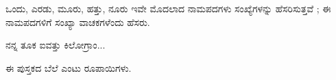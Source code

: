 
\indent ಒಂದು, ಎರಡು, ಮೂರು, ಹತ್ತು, ನೂರು ಇವೇ ಮೊದಲಾದ ನಾಮಪದಗಳು ಸಂಖ್ಯೆಗಳನ್ನು ಹೆಸರಿಸುತ್ತವೆ ; ಈ ನಾಮಪದಗಳಿಗೆ ಸಂಖ್ಯಾ ವಾಚಕಗಳೆಂದು ಹೆಸರು.\par

\vspace{2.5pt plus 3pt minus 0.5pt}\noindent\hspace*{1.2em}\hspace{0.55em}ನನ್ನ ತೂಕ ಐವತ್ತು ಕಿಲೋಗ್ರಾಂ...\par

\vspace{2.5pt plus 3pt minus 0.5pt}\noindent\hspace*{1.2em}\hspace{0.55em}ಈ ಪುಸ್ತಕದ ಬೆಲೆ ಎಂಟು ರೂಪಾಯಿಗಳು.\par
